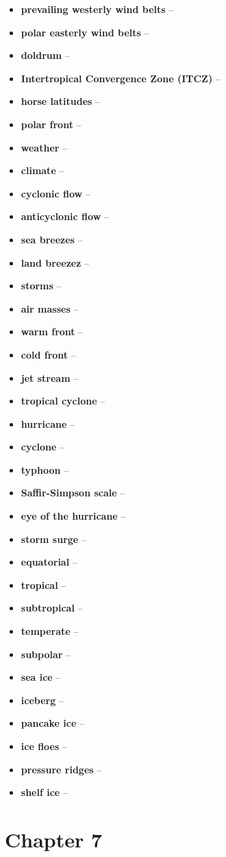 \begin{itemize}
	\item \textbf{prevailing westerly wind belts} --
	\item \textbf{polar easterly wind belts} --
	\item \textbf{doldrum} --
	\item \textbf{Intertropical Convergence Zone (ITCZ)} --
	\item \textbf{horse latitudes} --
	\item \textbf{polar front} --
	\item \textbf{weather} --
	\item \textbf{climate} --
	\item \textbf{cyclonic flow} --
	\item \textbf{anticyclonic flow} --
	\item \textbf{sea breezes} --
	\item \textbf{land breezez} --
	\item \textbf{storms} --
	\item \textbf{air masses} --
	\item \textbf{warm front} --
	\item \textbf{cold front} --
	\item \textbf{jet stream} --
	\item \textbf{tropical cyclone} --
	\item \textbf{hurricane} --
	\item \textbf{cyclone} --
	\item \textbf{typhoon} --
	\item \textbf{Saffir-Simpson scale} --
	\item \textbf{eye of the hurricane} --
	\item \textbf{storm surge} --
	\item \textbf{equatorial} --
	\item \textbf{tropical} --
	\item \textbf{subtropical} --
	\item \textbf{temperate} --
	\item \textbf{subpolar} --
	\item \textbf{sea ice} --
	\item \textbf{iceberg} --
	\item \textbf{pancake ice} --
	\item \textbf{ice floes} --
	\item \textbf{pressure ridges} --
	\item \textbf{shelf ice} --
\end{itemize}

\section{Chapter 7}
